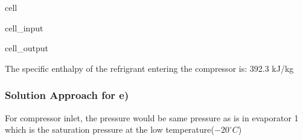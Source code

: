 \documentclass[letterpaper,10pt,english]{jupyterBook}
\begin{document}
\begin{sphinxuseclass}{cell}\begin{sphinxVerbatimInput}

\begin{sphinxuseclass}{cell_input}
\begin{sphinxVerbatim}[commandchars=\\\{\}]
  
  
    


        
  
\end{sphinxVerbatim}

\end{sphinxuseclass}\end{sphinxVerbatimInput}
\begin{sphinxVerbatimOutput}

\begin{sphinxuseclass}{cell_output}
\begin{sphinxVerbatim}[commandchars=\\\{\}]
The specific enthalpy of the refrigrant entering the compressor is: 392.3 kJ/kg
\end{sphinxVerbatim}

\end{sphinxuseclass}\end{sphinxVerbatimOutput}

\end{sphinxuseclass}

\subsubsection{Solution Approach for e)}
\label{\detokenize{notebooks/Chapter5/CH5-Q8:solution-approach-for-e}}
\sphinxAtStartPar
For compressor inlet, the pressure would be same pressure as is in evaporator 1 which is the saturation pressure at the low temperature(\(-20^{\circ} C\))
\end{document}
